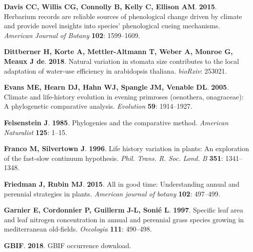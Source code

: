 \documentclass[man,floatsintext]{apa6}
\theoremstyle{definition}
\theoremstyle{definition}
\theoremstyle{definition}
\theoremstyle{remark}
\begin{document}
\leavevmode\hypertarget{ref-davis2015herbarium}{}%
\textbf{\textnormal{Davis CC}, \textnormal{Willis CG},
\textnormal{Connolly B}, \textnormal{Kelly C}, \textnormal{Ellison AM}}.
\textbf{2015}. Herbarium records are reliable sources of phenological
change driven by climate and provide novel insights into species'
phenological cueing mechanisms. \emph{American Journal of Botany}
\textbf{102}: 1599--1609.

\leavevmode\hypertarget{ref-dittberner2018natural}{}%
\textbf{\textnormal{Dittberner H}, \textnormal{Korte A},
\textnormal{Mettler-Altmann T}, \textnormal{Weber A}, \textnormal{Monroe
G}, \textnormal{Meaux J de}}. \textbf{2018}. Natural variation in
stomata size contributes to the local adaptation of water-use efficiency
in arabidopsis thaliana. \emph{bioRxiv}: 253021.

\leavevmode\hypertarget{ref-evans2005climate}{}%
\textbf{\textnormal{Evans ME}, \textnormal{Hearn DJ}, \textnormal{Hahn
WJ}, \textnormal{Spangle JM}, \textnormal{Venable DL}}. \textbf{2005}.
Climate and life-history evolution in evening primroses (oenothera,
onagraceae): A phylogenetic comparative analysis. \emph{Evolution}
\textbf{59}: 1914--1927.

\leavevmode\hypertarget{ref-felsenstein1985phylogenies}{}%
\textbf{\textnormal{Felsenstein J}}. \textbf{1985}. Phylogenies and the
comparative method. \emph{American Naturalist} \textbf{125}: 1--15.

\leavevmode\hypertarget{ref-franco1996life}{}%
\textbf{\textnormal{Franco M}, \textnormal{Silvertown J}}.
\textbf{1996}. Life history variation in plants: An exploration of the
fast-slow continuum hypothesis. \emph{Phil. Trans. R. Soc. Lond. B}
\textbf{351}: 1341--1348.

\leavevmode\hypertarget{ref-friedman2015all}{}%
\textbf{\textnormal{Friedman J}, \textnormal{Rubin MJ}}. \textbf{2015}.
All in good time: Understanding annual and perennial strategies in
plants. \emph{American journal of botany} \textbf{102}: 497--499.

\leavevmode\hypertarget{ref-garnier1997specific}{}%
\textbf{\textnormal{Garnier E}, \textnormal{Cordonnier P},
\textnormal{Guillerm J-L}, \textnormal{Sonié L}}. \textbf{1997}.
Specific leaf area and leaf nitrogen concentration in annual and
perennial grass species growing in mediterranean old-fields.
\emph{Oecologia} \textbf{111}: 490--498.

\leavevmode\hypertarget{ref-gbifdownload}{}%
\textbf{\textnormal{GBIF}}. \textbf{2018}. GBIF occurrence download.
\end{document}
